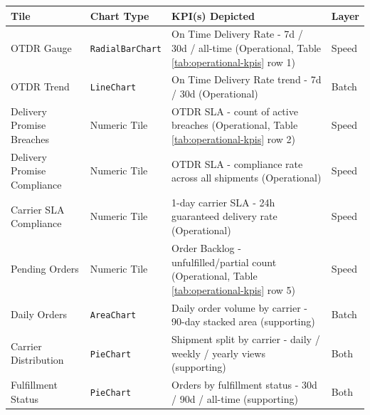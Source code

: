 \documentclass{imc-inf}
\begin{document}
\begin{table}[!htbp]
  \centering
  \small
  \begin{tabular}{@{}>{\raggedright\arraybackslash}p{3.5cm}>{\raggedright\arraybackslash}p{2.5cm}p{5.0cm}>{\raggedright\arraybackslash}p{1.5cm}@{}}
    \toprule
    \textbf{Tile}               & \textbf{Chart Type}     & \textbf{KPI(s) Depicted}                                                                                         & \textbf{Layer} \\
    \midrule
    OTDR Gauge                  & \texttt{RadialBarChart} & On Time Delivery Rate - 7d / 30d / all-time (Operational, Table \ref{tab:operational-kpis} row 1)                & Speed          \\[6pt]
    OTDR Trend                  & \texttt{LineChart}      & On Time Delivery Rate trend - 7d / 30d (Operational)                                                             & Batch          \\[6pt]
    Delivery Promise Breaches   & Numeric Tile            & OTDR SLA - count of active breaches (Operational, Table \ref{tab:operational-kpis} row 2)                        & Speed          \\[6pt]
    Delivery Promise Compliance & Numeric Tile            & OTDR SLA - compliance rate across all shipments (Operational)                                                    & Speed          \\[6pt]
    Carrier SLA Compliance      & Numeric Tile            & 1-day carrier SLA - 24h guaranteed delivery rate (Operational)                                                   & Speed          \\[6pt]
    Pending Orders              & Numeric Tile            & Order Backlog - unfulfilled/partial count (Operational, Table \ref{tab:operational-kpis} row 5)                  & Speed          \\[6pt]
    Daily Orders                & \texttt{AreaChart}      & Daily order volume by carrier - 90-day stacked area (supporting)                                                 & Batch          \\[6pt]
    Carrier Distribution        & \texttt{PieChart}       & Shipment split by carrier - daily / weekly / yearly views (supporting)                                           & Both           \\[6pt]
    Fulfillment Status          & \texttt{PieChart}       & Orders by fulfillment status - 30d / 90d / all-time (supporting)                                                 & Both           \\[6pt]

\end{tabular}
\end{table}
\end{document}
